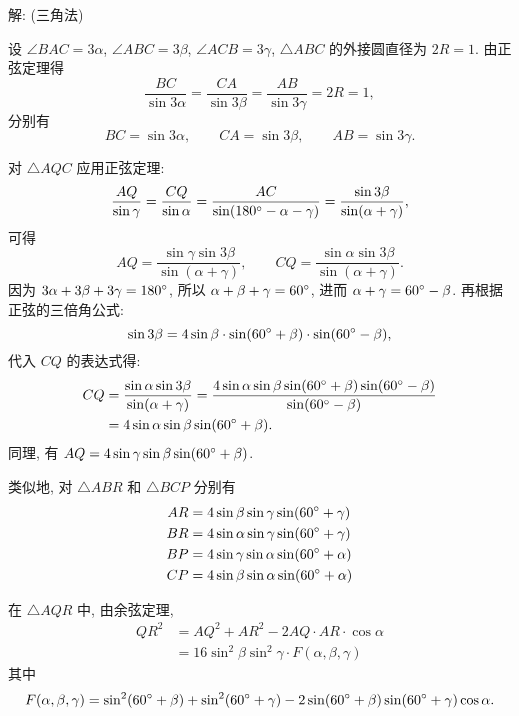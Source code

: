 \noindent 解: (三角法)

设 $\angle BAC = 3\alpha$, $\angle ABC = 3\beta$, $\angle ACB = 3\gamma$, $\triangle ABC$ 的外接圆直径为 $2R=1$. 由正弦定理得
\[\frac{BC}{\sin 3\alpha} = \frac{CA}{\sin 3\beta} = \frac{AB}{\sin 3\gamma} = 2R = 1 ,\]
分别有
\[BC = \sin 3\alpha, \qquad CA = \sin 3\beta, \qquad AB = \sin 3\gamma .\]

对 $\triangle AQC$ 应用正弦定理:
\[ \frac{AQ}{\sin\gamma} = \frac{CQ}{\sin\alpha} = \frac{AC}{\sin(180\degree-\alpha-\gamma)} = \frac{\sin 3\beta}{\sin(\alpha+\gamma)},\]
可得
\[AQ = \frac{\sin\gamma\sin 3\beta}{\sin(\alpha+\gamma)}, \qquad CQ = \frac{\sin\alpha\sin 3\beta}{\sin(\alpha+\gamma)} .\]
因为 $3\alpha+3\beta+3\gamma=180\degree$, 所以 $\alpha+\beta+\gamma=60\degree$, 进而 $\alpha+\gamma=60\degree - \beta$. 再根据正弦的三倍角公式:
\[\sin 3\beta = 4\sin\beta\cdot\sin(60\degree+\beta)\cdot\sin(60\degree-\beta) ,\]
代入 $CQ$ 的表达式得: 
\begin{align*}
CQ &= \frac{\sin\alpha\sin 3\beta}{\sin(\alpha+\gamma)} = \frac{4\sin\alpha\sin\beta\sin(60\degree+\beta)\sin(60\degree-\beta)}{\sin(60\degree-\beta)} \\
&= 4\sin\alpha\sin\beta\sin(60\degree+\beta) .
\end{align*}
同理, 有 $AQ = 4\sin\gamma\sin\beta\sin(60\degree+\beta)$.

类似地, 对 $\triangle ABR$ 和 $\triangle BCP$ 分别有 
\begin{align*}
AR &= 4\sin\beta\sin\gamma\sin(60\degree+\gamma) \\
BR &= 4\sin\alpha\sin\gamma\sin(60\degree+\gamma) \\
BP &= 4\sin\gamma\sin\alpha\sin(60\degree+\alpha) \\
CP &= 4\sin\beta\sin\alpha\sin(60\degree+\alpha)
\end{align*}

在 $\triangle AQR$ 中, 由余弦定理, 
\begin{align*}
QR^2 &= AQ^2 + AR^2 - 2AQ\cdot AR\cdot\cos\alpha \\
&= 16\sin^2\beta\sin^2\gamma \cdot F(\alpha,\beta,\gamma)
\end{align*}
其中 
$$F(\alpha,\beta,\gamma) = \sin^2(60\degree+\beta)+\sin^2(60\degree+\gamma) - 2\sin(60\degree+\beta)\sin(60\degree+\gamma)\cos\alpha.$$

